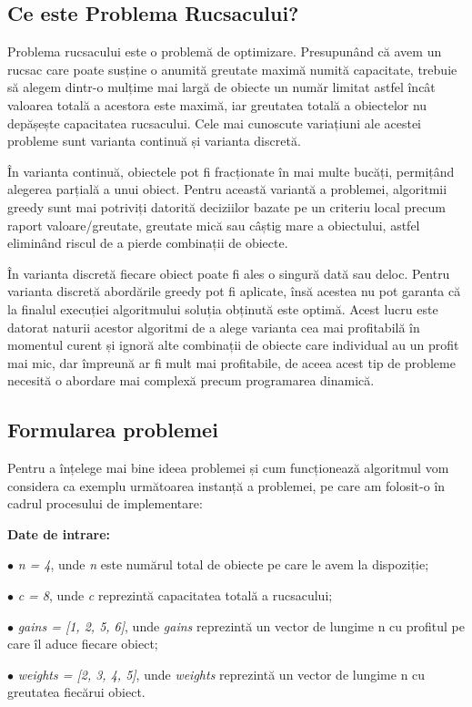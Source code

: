 \begin{sloppypar}
\subsection*{Ce este Problema Rucsacului?}
Problema rucsacului este o problemă de optimizare. Presupunând că avem un rucsac care poate susține o anumită greutate maximă numită capacitate, trebuie să alegem dintr-o mulțime mai largă de obiecte un număr limitat  astfel încât valoarea totală a acestora este maximă, iar greutatea totală a obiectelor nu depășește capacitatea rucsacului. Cele mai cunoscute variațiuni ale acestei probleme sunt varianta continuă și varianta discretă. \par 
În varianta continuă, obiectele pot fi fracționate în mai multe bucăți, permițând alegerea parțială a unui obiect. Pentru această variantă a problemei, algoritmii greedy sunt mai potriviți datorită deciziilor bazate pe un criteriu local precum raport valoare/greutate, greutate mică sau câștig mare a obiectului, astfel eliminând riscul de a pierde combinații de obiecte. \par
În varianta discretă fiecare obiect poate fi ales o singură dată sau deloc. Pentru varianta discretă abordările greedy pot fi aplicate, însă acestea nu pot garanta că la finalul execuției algoritmului soluția obținută este optimă. Acest lucru este datorat naturii acestor algoritmi de a alege varianta cea mai profitabilă în momentul curent și ignoră alte combinații de obiecte care individual au un profit mai mic, dar împreună ar fi mult mai profitabile, de aceea acest tip de probleme necesită o abordare mai complexă precum programarea dinamică.

\subsection*{Formularea problemei}
Pentru a înțelege mai bine ideea problemei și cum funcționează algoritmul vom considera ca exemplu următoarea instanță a problemei, pe care am folosit-o în cadrul procesului de implementare:
\begin{textbox}
\textbf{Date de intrare:} \par
$\bullet$ \textit{n = 4}, unde \textit{n} este numărul total de obiecte pe care le avem la dispoziție; \par
$\bullet$ \textit{c = 8}, unde \textit{c} reprezintă capacitatea totală a rucsacului; \par
$\bullet$ \textit{gains = [1, 2, 5, 6]}, unde \textit{gains} reprezintă un vector de lungime n cu profitul pe care îl aduce fiecare obiect; \par
$\bullet$ \textit{weights = [2, 3, 4, 5]}, unde \textit{weights} reprezintă un vector de lungime n cu greutatea fiecărui obiect.
\end{textbox}


\end{sloppypar}
